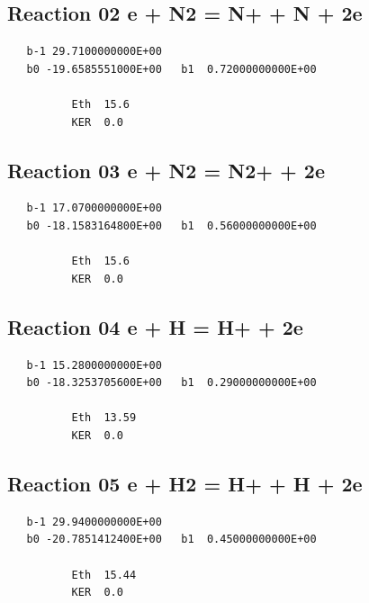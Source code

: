 \documentclass[12pt]{article}
\begin{document}
\subsection{
Reaction 02 e + N2 = N+ + N + 2e }
\begin{small}\begin{verbatim}
   b-1 29.7100000000E+00
   b0 -19.6585551000E+00   b1  0.72000000000E+00

          Eth  15.6
          KER  0.0

\end{verbatim}\end{small}
\newpage

\subsection{
Reaction 03 e + N2 = N2+ + 2e }
\begin{small}\begin{verbatim}
   b-1 17.0700000000E+00
   b0 -18.1583164800E+00   b1  0.56000000000E+00

          Eth  15.6
          KER  0.0

\end{verbatim}\end{small}
\newpage

\subsection{
Reaction 04 e + H = H+ + 2e }
\begin{small}\begin{verbatim}
   b-1 15.2800000000E+00
   b0 -18.3253705600E+00   b1  0.29000000000E+00

          Eth  13.59
          KER  0.0

\end{verbatim}\end{small}
\newpage

\subsection{
Reaction 05 e + H2 = H+ + H + 2e }
\begin{small}\begin{verbatim}
   b-1 29.9400000000E+00
   b0 -20.7851412400E+00   b1  0.45000000000E+00

          Eth  15.44
          KER  0.0

\end{verbatim}\end{small}
\newpage
\end{document}
